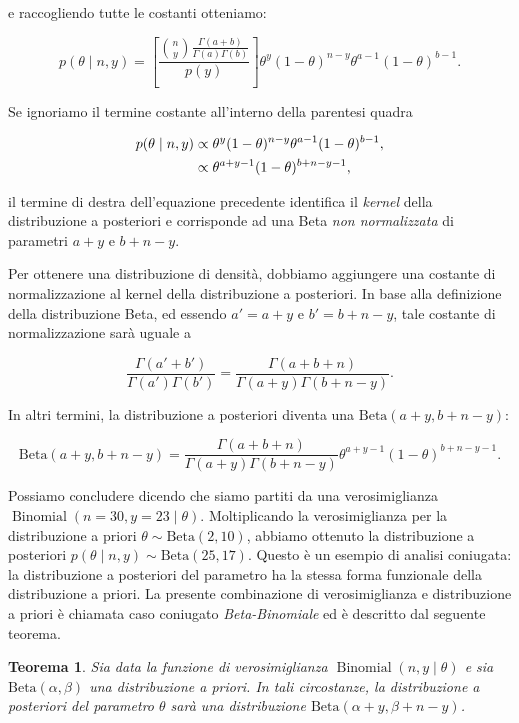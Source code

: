 \documentclass[
  11pt,
]{krantz}
\DeclareMathOperator{\Bin}{Binomial} %
\newtheorem{theorem}{Teorema}[chapter]
\theoremstyle{definition}
\theoremstyle{definition}
\theoremstyle{definition}
\theoremstyle{definition}
\theoremstyle{remark}
\begin{document}
e raccogliendo tutte le costanti otteniamo:

\[
p(\theta \mid n, y) =\left[\frac{\binom{n}{y}\frac{\Gamma(a+b)}{\Gamma(a)\Gamma(b)}}{p(y)}\right] \theta^{y}(1-\theta)^{n-y}\theta^{a-1} (1-\theta)^{b-1}.
\]

Se ignoriamo il termine costante all'interno della parentesi quadra

\begin{align}
p(\theta \mid n, y) &\propto \theta^{y}(1-\theta)^{n-y}\theta^{a-1} (1-\theta)^{b-1},\notag\\
&\propto \theta^{a+y-1}(1-\theta)^{b+n-y-1},\notag
\end{align}

il termine di destra dell'equazione precedente identifica il \emph{kernel} della distribuzione a posteriori e corrisponde ad una Beta \emph{non normalizzata} di parametri \(a + y\) e \(b + n - y\).

Per ottenere una distribuzione di densità, dobbiamo aggiungere una costante di normalizzazione al kernel della distribuzione a posteriori. In base alla definizione della distribuzione Beta, ed essendo \(a' = a+y\) e \(b' = b+n-y\), tale costante di normalizzazione sarà uguale a

\[
\frac{\Gamma(a'+b')}{\Gamma(a')\Gamma(b')} = \frac{\Gamma(a+b+n)}{\Gamma(a+y)\Gamma(b+n-y)}.
\]

In altri termini, la distribuzione a posteriori diventa una \(\mbox{Beta}(a+y, b+n-y)\):

\[
\mbox{Beta}(a+y, b+n-y) = \frac{\Gamma(a+b+n)}{\Gamma(a+y)\Gamma(b+n-y)} \theta^{a+y-1}(1-\theta)^{b+n-y-1}.
\]

Possiamo concludere dicendo che siamo partiti da una verosimiglianza \(\Bin(n = 30, y = 23 \mid \theta)\). Moltiplicando la verosimiglianza per la distribuzione a priori \(\theta \sim \mbox{Beta}(2, 10)\), abbiamo ottenuto la distribuzione a posteriori \(p(\theta \mid n, y) \sim \mbox{Beta}(25, 17)\). Questo è un esempio di analisi coniugata: la distribuzione a posteriori del parametro ha la stessa forma funzionale della distribuzione a priori. La presente combinazione di verosimiglianza e distribuzione a priori è chiamata caso coniugato \emph{Beta-Binomiale} ed è descritto dal seguente teorema.

\begin{theorem}
Sia data la funzione di verosimiglianza \(\Bin(n, y \mid \theta)\) e sia \(\mbox{Beta}(\alpha, \beta)\) una distribuzione a priori. In tali circostanze, la distribuzione a posteriori del parametro \(\theta\) sarà una distribuzione \(\mbox{Beta}(\alpha + y, \beta + n - y)\).
\end{theorem}
\end{document}
